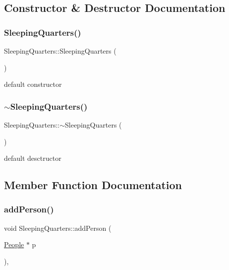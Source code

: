 \subsection{Constructor \& Destructor Documentation}
\mbox{\label{classSleepingQuarters_ab4055fa9d6ac27506b1577faec404fbb}} 
\subsubsection{\texorpdfstring{Sleeping\+Quarters()}{SleepingQuarters()}}
{\footnotesize\ttfamily Sleeping\+Quarters\+::\+Sleeping\+Quarters (\begin{DoxyParamCaption}{ }\end{DoxyParamCaption})}

default constructor \mbox{\label{classSleepingQuarters_ad32e286540e322186993b15f5ebcffbc}} 
\subsubsection{\texorpdfstring{$\sim$\+Sleeping\+Quarters()}{~SleepingQuarters()}}
{\footnotesize\ttfamily Sleeping\+Quarters\+::$\sim$\+Sleeping\+Quarters (\begin{DoxyParamCaption}{ }\end{DoxyParamCaption})}

default desctructor 

\subsection{Member Function Documentation}
\mbox{\label{classSleepingQuarters_addd107a8005b61d51846e8e955922d50}} 
\subsubsection{\texorpdfstring{add\+Person()}{addPerson()}}
{\footnotesize\ttfamily void Sleeping\+Quarters\+::add\+Person (\begin{DoxyParamCaption}\item[{\hyperlink{classPeople}{People} $\ast$}]{p }\end{DoxyParamCaption})\hspace{0.3cm}{\ttfamily [inline]}, {\ttfamily [virtual]}}

